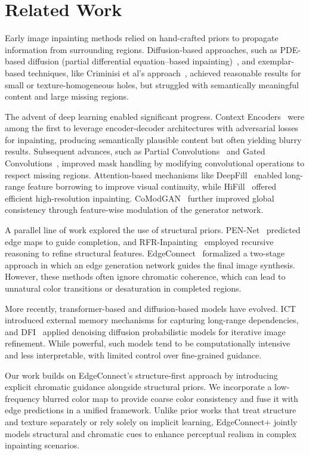 \section{Related Work}
\label{sec:related_work}

Early image inpainting methods relied on hand-crafted priors to propagate information from surrounding regions. Diffusion-based approaches, such as PDE-based diffusion (partial differential equation–based inpainting)~\cite{bertalmio2000image}, and exemplar-based techniques, like Criminisi et al's approach~\cite{criminisi2004region}, achieved reasonable results for small or texture-homogeneous holes, but struggled with semantically meaningful content and large missing regions.

The advent of deep learning enabled significant progress. Context Encoders~\cite{pathak2016context} were among the first to leverage encoder-decoder architectures with adversarial losses for inpainting, producing semantically plausible content but often yielding blurry results. Subsequent advances, such as Partial Convolutions~\cite{liu2018partial} and Gated Convolutions~\cite{yu2019free}, improved mask handling by modifying convolutional operations to respect missing regions. Attention-based mechanisms like DeepFill~\cite{yu2018generative} enabled long-range feature borrowing to improve visual continuity, while HiFill~\cite{yi2020contextual} offered efficient high-resolution inpainting. CoModGAN~\cite{zhao2021comodgan} further improved global consistency through feature-wise modulation of the generator network.

A parallel line of work explored the use of structural priors. PEN-Net~\cite{zeng2020learning} predicted edge maps to guide completion, and RFR-Inpainting~\cite{li2020recurrent} employed recursive reasoning to refine structural features. EdgeConnect~\cite{nazeri2019edgeconnect} formalized a two-stage approach in which an edge generation network guides the final image synthesis. However, these methods often ignore chromatic coherence, which can lead to unnatural color transitions or desaturation in completed regions.

More recently, transformer-based and diffusion-based models have evolved. ICT~\cite{wan2021image} introduced external memory mechanisms for capturing long-range dependencies, and DFI~\cite{lugmayr2022repaint} applied denoising diffusion probabilistic models for iterative image refinement. While powerful, such models tend to be computationally intensive and less interpretable, with limited control over fine-grained guidance.

Our work builds on EdgeConnect’s structure-first approach by introducing explicit chromatic guidance alongside structural priors. We incorporate a low-frequency blurred color map to provide coarse color consistency and fuse it with edge predictions in a unified framework. Unlike prior works that treat structure and texture separately or rely solely on implicit learning, EdgeConnect+ jointly models structural and chromatic cues to enhance perceptual realism in complex inpainting scenarios.
